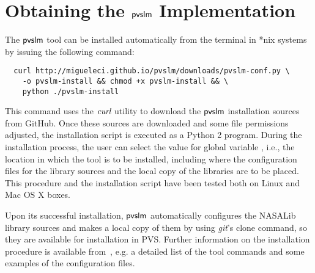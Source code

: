 \section{Obtaining the $\textsf{pvslm}$ Implementation}
\label{sec.install}

The $\textsf{pvslm}$ tool can be installed automatically from the terminal in
*nix systems by issuing the following command:
%
{\small\begin{verbatim}
  curl http://migueleci.github.io/pvslm/downloads/pvslm-conf.py \
    -o pvslm-install && chmod +x pvslm-install && \
    python ./pvslm-install
\end{verbatim}}
%
This command uses the $\textit{curl}$ utility to download the $\textsf{pvslm}$
installation sources from GitHub. Once these sources are downloaded
and some file permissions adjusted, the installation script is
executed as a Python 2 program. During the installation process, the
user can select the value for global variable \cde{PVS\_PATH}, i.e.,
the location in which the tool is to be installed, including where the
configuration files for the library sources and the local copy of the
libraries are to be placed. This procedure and the installation script
have been tested both on Linux and Mac OS X boxes.

Upon its successful installation, $\textsf{pvslm}$ automatically configures
the NASALib library sources and makes a local copy of them by using
{\em git}'s clone command, so they are available for installation in
PVS.  Further information on the installation procedure is available
from~\cite{pvslm}, e.g. a detailed list of the tool commands and some
examples of the configuration files.
